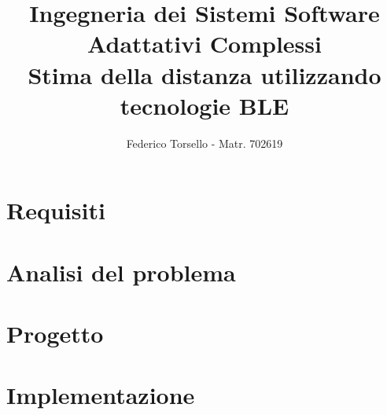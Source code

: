 \documentclass[a4paper,oneside,11pt]{report}
\title{Ingegneria dei Sistemi Software
	\\ Adattativi Complessi
	\\{\Large Stima della distanza utilizzando tecnologie BLE}}
\author{Federico Torsello - Matr. 702619}
\begin{document}
	\maketitle
	\tableofcontents
	
	
	
	\part{Requisiti}
	
	
	\part{Analisi del problema}
	
	
	
	
	
	\part{Progetto}
	
	
	
	
	
	\part{Implementazione}
	
	
	
\end{document}
